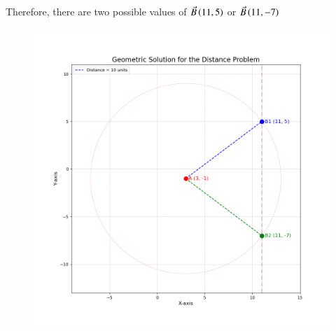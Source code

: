 \documentclass[journal]{IEEEtran}
\begin{document}
Therefore, there are two possible values of $\Vec{B}\left(11,5\right)$ or $\Vec{B}\left(11,-7\right)$
\newpage
\begin{figure}[H]
    \centering
    \includegraphics[width=\columnwidth]{figs/distance_plot.png}
\end{figure}
\end{document}
